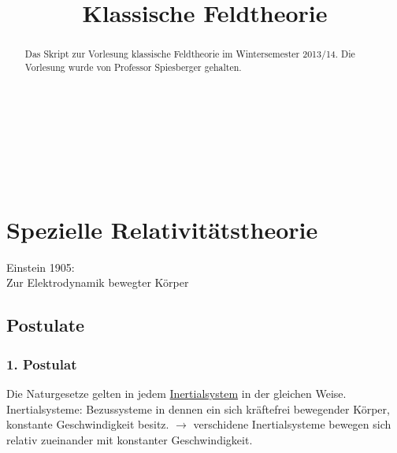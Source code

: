 \documentclass[a4paper]{article}
\title{Klassische Feldtheorie}
\author{}
\date{}
\begin{document}
\maketitle
\begin{verbatim}






\end{verbatim}
\begin{abstract}
Das Skript zur Vorlesung klassische Feldtheorie im Wintersemester 2013/14. Die Vorlesung wurde von Professor Spiesberger gehalten.
\end{abstract}
\newpage
\tableofcontents
\setcounter{tocdepth}{5}
\newpage

\section{Spezielle Relativitätstheorie}

Einstein 1905:\\
Zur Elektrodynamik bewegter Körper

\subsection{Postulate}
\subsubsection{1. Postulat}
Die Naturgesetze gelten in jedem
\underline{Inertialsystem} in der gleichen Weise.\\
Inertialsysteme: Bezussysteme in dennen ein sich kräftefrei bewegender Körper,
konstante Geschwindigkeit besitz.
$\rightarrow$ verschidene Inertialsysteme bewegen sich relativ zueinander mit
konstanter Geschwindigkeit.
\end{document}
